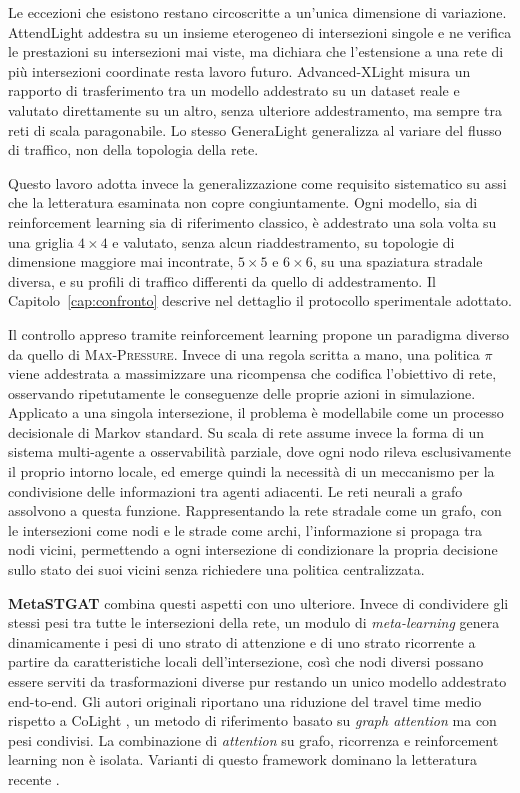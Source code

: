 Le eccezioni che esistono restano circoscritte a un'unica dimensione di
variazione. AttendLight \citep{oroojlooy2020attendlight} addestra su un
insieme eterogeneo di intersezioni singole e ne verifica le prestazioni
su intersezioni mai viste, ma dichiara che l'estensione a una rete di più
intersezioni coordinate resta lavoro futuro. Advanced-XLight
\citep{zhang2022advancedxlight} misura un rapporto di trasferimento tra
un modello addestrato su un dataset reale e valutato direttamente su un
altro, senza ulteriore addestramento, ma sempre tra reti di scala
paragonabile. Lo stesso GeneraLight generalizza al variare del flusso di
traffico, non della topologia della rete.

Questo lavoro adotta invece la generalizzazione come requisito
sistematico su assi che la letteratura esaminata non copre
congiuntamente. Ogni modello, sia di reinforcement learning sia di
riferimento classico, è addestrato una sola volta su una griglia
$4\times4$ e valutato, senza alcun riaddestramento, su topologie di
dimensione maggiore mai incontrate, $5\times5$ e $6\times6$, su una
spaziatura stradale diversa, e su profili di traffico differenti da
quello di addestramento. Il Capitolo~\ref{cap:confronto} descrive nel
dettaglio il protocollo sperimentale adottato.

Il controllo appreso tramite reinforcement learning propone un paradigma
diverso da quello di \textsc{Max-Pressure}. Invece di una regola scritta
a mano, una politica $\pi$ viene addestrata a massimizzare una ricompensa
che codifica l'obiettivo di rete, osservando ripetutamente le conseguenze
delle proprie azioni in simulazione. Applicato a una singola
intersezione, il problema è modellabile come un processo decisionale di
Markov standard. Su scala di rete assume invece la forma di un sistema
multi-agente a osservabilità parziale, dove ogni nodo rileva
esclusivamente il proprio intorno locale, ed emerge quindi la necessità
di un meccanismo per la condivisione delle informazioni tra agenti
adiacenti. Le reti neurali a grafo assolvono a questa funzione.
Rappresentando la rete stradale come un grafo, con le intersezioni come
nodi e le strade come archi, l'informazione si propaga tra nodi vicini,
permettendo a ogni intersezione di condizionare la propria decisione
sullo stato dei suoi vicini senza richiedere una politica centralizzata.

\textbf{MetaSTGAT} \citep{wang2022metastgat} combina questi aspetti con
uno ulteriore. Invece di condividere gli stessi pesi tra tutte le
intersezioni della rete, un modulo di \emph{meta-learning} genera
dinamicamente i pesi di uno strato di attenzione e di uno strato
ricorrente a partire da caratteristiche locali dell'intersezione, così
che nodi diversi possano essere serviti da trasformazioni diverse pur
restando un unico modello addestrato end-to-end. Gli autori originali
riportano una riduzione del travel time medio rispetto a CoLight
\citep{wei2019colight}, un metodo di riferimento basato su \emph{graph
attention} ma con pesi condivisi. La combinazione di \emph{attention} su
grafo, ricorrenza e reinforcement learning non è isolata. Varianti di
questo framework dominano la letteratura recente
\citep{wang2026astgcndrl, sun2026tgmaddpg, hu2026mpnnlight}.

